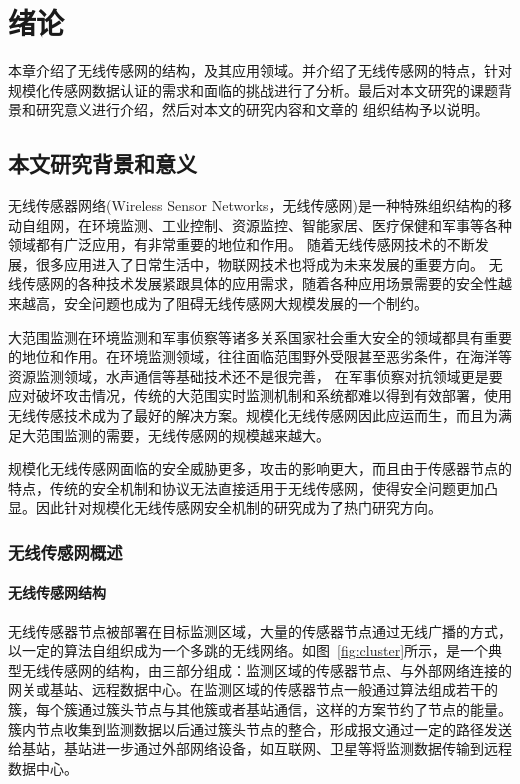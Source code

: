 \chapter{绪论}
本章介绍了无线传感网的结构，及其应用领域。并介绍了无线传感网的特点，针对规模化传感网数据认证的需求和面临的挑战进行了分析。最后对本文研究的课题背景和研究意义进行介绍，然后对本文的研究内容和文章的
组织结构予以说明。
\section{本文研究背景和意义}
无线传感器网络(Wireless Sensor Networks，无线传感网)是一种特殊组织结构的移动自组网，在环境监测、工业控制、资源监控、智能家居、医疗保健和军事等各种领域都有广泛应用，有非常重要的地位和作用。
随着无线传感网技术的不断发展，很多应用进入了日常生活中，物联网技术也将成为未来发展的重要方向。
无线传感网的各种技术发展紧跟具体的应用需求，随着各种应用场景需要的安全性越来越高，安全问题也成为了阻碍无线传感网大规模发展的一个制约。

大范围监测在环境监测和军事侦察等诸多关系国家社会重大安全的领域都具有重要的地位和作用。在环境监测领域，往往面临范围野外受限甚至恶劣条件，在海洋等资源监测领域，水声通信等基础技术还不是很完善， 在军事侦察对抗领域更是要应对破坏攻击情况，传统的大范围实时监测机制和系统都难以得到有效部署，使用无线传感技术成为了最好的解决方案。规模化无线传感网因此应运而生，而且为满足大范围监测的需要，无线传感网的规模越来越大。

规模化无线传感网面临的安全威胁更多，攻击的影响更大，而且由于传感器节点的特点，传统的安全机制和协议无法直接适用于无线传感网，使得安全问题更加凸显。因此针对规模化无线传感网安全机制的研究成为了热门研究方向。

\subsection{无线传感网概述}
\subsubsection{无线传感网结构}
无线传感器节点被部署在目标监测区域，大量的传感器节点通过无线广播的方式，以一定的算法自组织成为一个多跳的无线网络。如图~\ref{fig:cluster}所示，是一个典型无线传感网的结构，由三部分组成：监测区域的传感器节点、与外部网络连接的网关或基站、远程数据中心。在监测区域的传感器节点一般通过算法组成若干的簇，每个簇通过簇头节点与其他簇或者基站通信，这样的方案节约了节点的能量。簇内节点收集到监测数据以后通过簇头节点的整合，形成报文通过一定的路径发送给基站，基站进一步通过外部网络设备，如互联网、卫星等将监测数据传输到远程数据中心。

